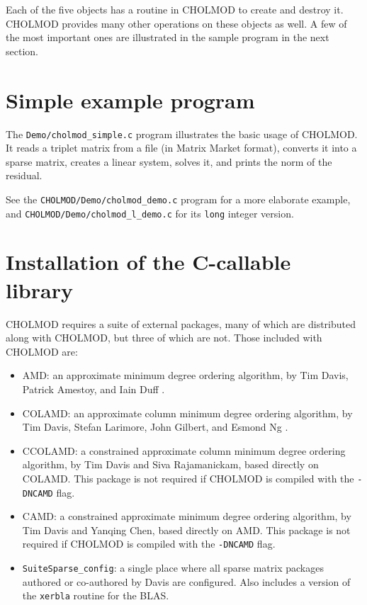 \documentclass[11pt]{article}
\begin{document}
Each of the five objects has a routine in CHOLMOD to create and destroy it.
CHOLMOD provides many other operations on these objects as well.
A few of the most important ones are illustrated in the sample program in the
next section.

\newpage \section{Simple example program}


The {\tt Demo/cholmod\_simple.c} program illustrates the
basic usage of CHOLMOD.  It reads a triplet matrix from a file
(in Matrix Market format), converts it into a sparse matrix,
creates a linear system, solves it, and prints the norm of the residual.

See the {\tt CHOLMOD/Demo/cholmod\_demo.c} program for a more elaborate
example, and \newline
{\tt CHOLMOD/Demo/cholmod\_l\_demo.c} for its {\tt long} integer version.

\newpage \section{Installation of the C-callable library}
\label{Install}

CHOLMOD requires a suite of external packages, many of which are distributed
along with CHOLMOD, but three of which are not.  Those included with CHOLMOD are:
\begin{itemize}
\item AMD: an approximate minimum degree ordering algorithm,
    by Tim Davis, Patrick Amestoy, and Iain Duff
    \cite{AmestoyDavisDuff96,AmestoyDavisDuff03}.
\item COLAMD: an approximate column minimum degree ordering algorithm,
    by Tim Davis, Stefan Larimore, John Gilbert, and Esmond Ng
    \cite{DavisGilbertLarimoreNg00_algo,DavisGilbertLarimoreNg00}.
\item CCOLAMD: a constrained approximate column minimum degree ordering
    algorithm,
    by Tim Davis and Siva Rajamanickam, based directly on COLAMD.
    This package is not required if CHOLMOD is compiled with the
    {\tt -DNCAMD} flag.
\item CAMD: a constrained approximate minimum degree ordering
    algorithm,
    by Tim Davis and Yanqing Chen, based directly on AMD.
    This package is not required if CHOLMOD is compiled with the
    {\tt -DNCAMD} flag.
\item {\tt SuiteSparse\_config}:
    a single place where all sparse matrix packages authored
    or co-authored by Davis are configured.  Also includes a version of the
    {\tt xerbla} routine for the BLAS.
\end{itemize}
\end{document}
